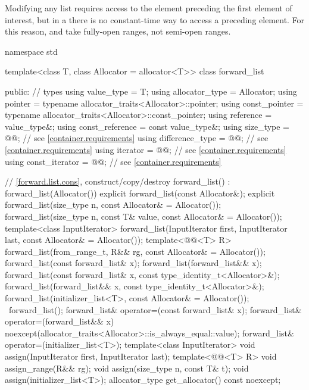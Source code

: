 \pnum
\begin{note}
Modifying any list requires access to the element preceding the first element
of interest, but in a  there is no constant-time way to access a
preceding element.
For this reason,  and 
take fully-open ranges, not semi-open ranges.
\end{note}

\begin{codeblock}
namespace std {
  template<class T, class Allocator = allocator<T>>
  class forward_list {
  public:
    // types
    using value_type      = T;
    using allocator_type  = Allocator;
    using pointer         = typename allocator_traits<Allocator>::pointer;
    using const_pointer   = typename allocator_traits<Allocator>::const_pointer;
    using reference       = value_type&;
    using const_reference = const value_type&;
    using size_type       = @@; // see \ref{container.requirements}
    using difference_type = @@; // see \ref{container.requirements}
    using iterator        = @@; // see \ref{container.requirements}
    using const_iterator  = @@; // see \ref{container.requirements}

    // \ref{forward.list.cons}, construct/copy/destroy
    forward_list() : forward_list(Allocator()) { }
    explicit forward_list(const Allocator&);
    explicit forward_list(size_type n, const Allocator& = Allocator());
    forward_list(size_type n, const T& value, const Allocator& = Allocator());
    template<class InputIterator>
      forward_list(InputIterator first, InputIterator last, const Allocator& = Allocator());
    template<@@<T> R>
      forward_list(from_range_t, R&& rg, const Allocator& = Allocator());
    forward_list(const forward_list& x);
    forward_list(forward_list&& x);
    forward_list(const forward_list& x, const type_identity_t<Allocator>&);
    forward_list(forward_list&& x, const type_identity_t<Allocator>&);
    forward_list(initializer_list<T>, const Allocator& = Allocator());
    ~forward_list();
    forward_list& operator=(const forward_list& x);
    forward_list& operator=(forward_list&& x)
      noexcept(allocator_traits<Allocator>::is_always_equal::value);
    forward_list& operator=(initializer_list<T>);
    template<class InputIterator>
      void assign(InputIterator first, InputIterator last);
    template<@@<T> R>
      void assign_range(R&& rg);
    void assign(size_type n, const T& t);
    void assign(initializer_list<T>);
    allocator_type get_allocator() const noexcept;

}}
\end{codeblock}
